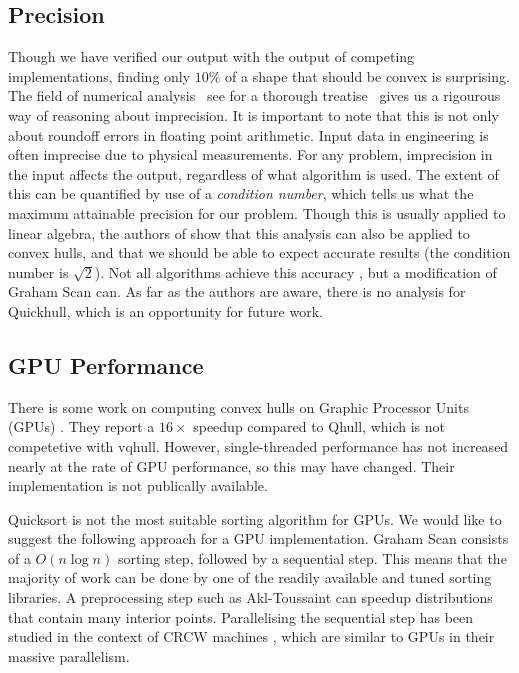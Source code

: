 \subsection{Precision}


Though we have verified our output with the output of competing implementations,
finding only $10\%$ of a shape that should be convex is surprising. The field
of numerical analysis 
\textemdash{}~see \cite{Higham02} for a thorough treatise~\textemdash{} gives
us a rigourous way of reasoning about imprecision. It is important to note that
this is not only about roundoff errors in floating point arithmetic. Input data
in engineering is often imprecise due to physical measurements. 
For any problem, imprecision in the input affects the output, regardless of what
algorithm is used. The extent of this can be quantified by use of a
\textit{condition number}, which tells us what the maximum attainable precision
for our problem.
Though this is usually applied to linear algebra, the authors of
\cite{Jiang06} show that this analysis can also be applied to convex hulls,
and that we should be able to expect accurate results (the condition number
is $\sqrt{2}$). Not all algorithms achieve this accuracy \cite{Kettner08},
but a modification of Graham Scan \cite{Fortune89} can.
As far as the authors are aware, there is no analysis for Quickhull,
which is an opportunity for future work.

\subsection{GPU Performance}

There is some work on computing convex hulls on Graphic Processor Units (GPUs)
\cite{Srungarapu11}. They report a $16\times$ speedup compared to Qhull, which
is not competetive with vqhull. However, single-threaded performance has not
increased nearly at the rate of GPU performance, so this may have changed. Their
implementation is not publically available.

Quicksort is not the most suitable sorting algorithm for GPUs. We would like
to suggest the following approach for a GPU implementation. Graham Scan consists
of a $O(n \log n)$ sorting step, followed by a sequential step. This means that
the majority of work can be done by one of the readily available and tuned
sorting libraries. A preprocessing step such as Akl-Toussaint can speedup 
distributions that contain many interior points. Parallelising the sequential
step has been studied in the context of CRCW machines \cite{Goodrich87},
which are similar to GPUs in their massive parallelism.

